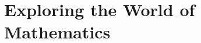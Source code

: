 \ifdefined\inmaster\else\def\subonly{\jobname}\fi

\chapter{Exploring the World of Mathematics}
\label{sec:exploring-world}

